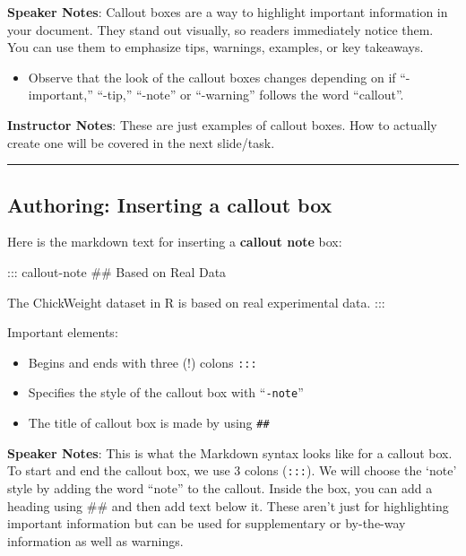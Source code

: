 \documentclass[
  letterpaper,
  DIV=11,
  numbers=noendperiod]{scrartcl}
\newenvironment{Shaded}{\begin{snugshade}}{\end{snugshade}}
\newcommand{\NormalTok}[1]{\textcolor[rgb]{0.00,0.23,0.31}{#1}}
\providecommand{\tightlist}{%
  \setlength{\itemsep}{0pt}\setlength{\parskip}{0pt}}
\begin{document}
\textbf{Speaker Notes}: Callout boxes are a way to highlight important
information in your document. They stand out visually, so readers
immediately notice them. You can use them to emphasize tips, warnings,
examples, or key takeaways.

\begin{itemize}
\tightlist
\item
  Observe that the look of the callout boxes changes depending on if
  ``-important,'' ``-tip,'' ``-note'' or ``-warning'' follows the word
  ``callout''.
\end{itemize}

\textbf{Instructor Notes}: These are just examples of callout boxes. How
to actually create one will be covered in the next slide/task.

\begin{center}\rule{0.5\linewidth}{0.5pt}\end{center}

\subsection{Authoring: Inserting a callout
box}\label{authoring-inserting-a-callout-box}

Here is the markdown text for inserting a \textbf{callout note} box:

\begin{Shaded}
\begin{Highlighting}[]
\NormalTok{::: callout{-}note}
\NormalTok{\#\# Based on Real Data}

\NormalTok{The ChickWeight dataset in R is based on real experimental data.}
\NormalTok{:::}
\end{Highlighting}
\end{Shaded}

Important elements:

\begin{itemize}
\tightlist
\item
  Begins and ends with three (!) colons \texttt{:::}
\item
  Specifies the style of the callout box with ``\texttt{-note}''
\item
  The title of callout box is made by using \texttt{\#\#}
\end{itemize}

\textbf{Speaker Notes}: This is what the Markdown syntax looks like for
a callout box. To start and end the callout box, we use 3 colons
(\texttt{:::}). We will choose the `note' style by adding the word
``note'' to the callout. Inside the box, you can add a heading using
\#\# and then add text below it. These aren't just for highlighting
important information but can be used for supplementary or by-the-way
information as well as warnings.
\end{document}
